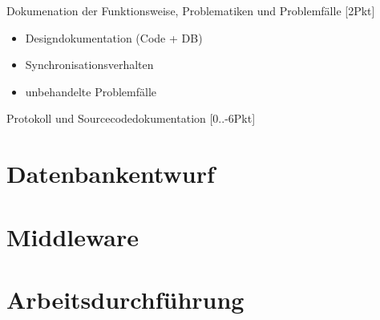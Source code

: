 \documentclass[a4paper]{article}
\begin{document}
	Dokumenation der Funktionsweise, Problematiken und Problemfälle [2Pkt]
	\begin{itemize}
		\item Designdokumentation (Code + DB)
		\item Synchronisationsverhalten
		\item unbehandelte Problemfälle\\
	\end{itemize}
	
	Protokoll und Sourcecodedokumentation [0..-6Pkt]
	
	\newpage
	\section{Datenbankentwurf}
	\section{Middleware}
	\section{Arbeitsdurchführung}
\end{document}
